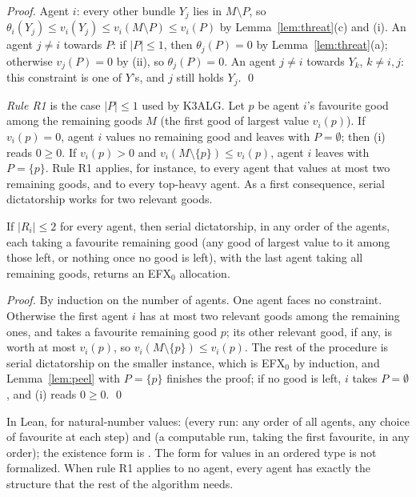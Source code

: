 \documentclass[runningheads,11pt]{llncs}
\newcommand{\efxz}{\texorpdfstring{\mbox{EFX$_0$}}{EFX0}}
\begin{document}
\begin{proof}
Agent $i$: every other bundle $Y_j$ lies in $M\setminus P$, so $\theta_i(Y_j)\le v_i(Y_j)\le v_i(M\setminus P)\le v_i(P)$ by Lemma~\ref{lem:threat}(c) and (i). An agent $j\ne i$ towards $P$: if $|P|\le1$, then $\theta_j(P)=0$ by Lemma~\ref{lem:threat}(a); otherwise $v_j(P)=0$ by (ii), so $\theta_j(P)=0$. An agent $j\ne i$ towards $Y_k$, $k\ne i,j$: this constraint is one of $Y$'s, and $j$ still holds $Y_j$. \qed
\end{proof}

\noindent \emph{Rule R1} is the case $|P|\le1$ used by K3ALG. Let $p$ be agent $i$'s favourite good among the remaining goods $M$ (the first good of largest value $v_i(p)$). If $v_i(p)=0$, agent $i$ values no remaining good and leaves with $P=\emptyset$; then (i) reads $0\ge0$. If $v_i(p)>0$ and $v_i(M\setminus\{p\})\le v_i(p)$, agent $i$ leaves with $P=\{p\}$. Rule R1 applies, for instance, to every agent that values at most two remaining goods, and to every top-heavy agent. As a first consequence, serial dictatorship works for two relevant goods.

\begin{corollary}\label{cor:k2}
If $|R_i|\le2$ for every agent, then serial dictatorship, in any order of the agents, each taking a favourite remaining good (any good of largest value to it among those left, or nothing once no good is left), with the last agent taking all remaining goods, returns an \efxz{} allocation.
\end{corollary}

\begin{proof}
By induction on the number of agents. One agent faces no constraint. Otherwise the first agent $i$ has at most two relevant goods among the remaining ones, and takes a favourite remaining good $p$; its other relevant good, if any, is worth at most $v_i(p)$, so $v_i(M\setminus\{p\})\le v_i(p)$. The rest of the procedure is serial dictatorship on the smaller instance, which is \efxz{} by induction, and Lemma~\ref{lem:peel} with $P=\{p\}$ finishes the proof; if no good is left, $i$ takes $P=\emptyset$, and (i) reads $0\ge0$. \qed
\end{proof}

\noindent In Lean, for natural-number values:  (every run: any order of all agents, any choice of favourite at each step) and  (a computable run, taking the first favourite, in any order); the existence form is . The form for values in an ordered type is not formalized. When rule R1 applies to no agent, every agent has exactly the structure that the rest of the algorithm needs.
\end{document}
